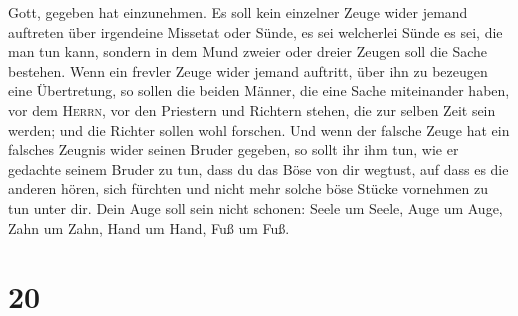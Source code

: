 Gott, gegeben hat einzunehmen.  Es soll kein einzelner
Zeuge wider jemand auftreten über irgendeine Missetat oder Sünde, es sei
welcherlei Sünde es sei, die man tun kann, sondern in dem Mund zweier
oder dreier Zeugen soll die Sache bestehen.  Wenn ein
frevler Zeuge wider jemand auftritt, über ihn zu bezeugen eine
Übertretung,  so sollen die beiden Männer, die eine Sache
miteinander haben, vor dem \textsc{Herrn}, vor den Priestern und
Richtern stehen, die zur selben Zeit sein werden;  und
die Richter sollen wohl forschen. Und wenn der falsche Zeuge hat ein
falsches Zeugnis wider seinen Bruder gegeben,  so sollt
ihr ihm tun, wie er gedachte seinem Bruder zu tun, dass du das Böse von
dir wegtust,  auf dass es die anderen hören, sich
fürchten und nicht mehr solche böse Stücke vornehmen zu tun unter dir.
 Dein Auge soll sein nicht schonen: Seele um Seele, Auge
um Auge, Zahn um Zahn, Hand um Hand, Fuß um Fuß.

\hypertarget{section-19}{%
\section{20}\label{section-19}}

